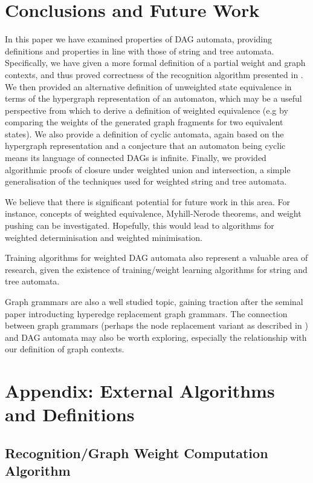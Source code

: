 \documentclass[11pt]{article}
\begin{document}
\section{Conclusions and Future Work}
In this paper we have examined properties of DAG automata, providing definitions
and properties in line with those of string and tree automata. Specifically, we
have given a more formal definition of a partial weight and graph contexts, and thus proved
correctness of the recognition algorithm presented in \cite{chiang2018weighted}.
We then provided an alternative definition of unweighted state equivalence in
terms of the hypergraph representation of an automaton, which may be a useful
perspective from which to derive a definition of weighted equivalence (e.g by
comparing the weights of the generated graph fragments for two equivalent
states). We also provide a definition of cyclic automata, again based on the
hypergraph representation and a conjecture that an automaton being cyclic means
its language of connected DAGs is infinite. Finally, we provided algorithmic proofs of
closure under weighted union and intersection, a simple generalisation of the
techniques used for weighted string and tree automata.  

We believe that there is significant potential for future work in this area. For
instance, concepts of weighted equivalence, Myhill-Nerode theorems, and weight
pushing can be investigated. Hopefully, this would lead to algorithms for weighted determinisation and
weighted minimisation. 

Training algorithms for weighted DAG automata also represent a valuable area of
research, given the existence of training/weight learning algorithms for string
and tree automata.

Graph grammars are also a well studied topic, gaining traction after the seminal
paper \cite{drewes1997hyperedge} introducting hyperedge replacement graph
grammars. The connection between graph grammars (perhaps the node replacement
variant as described in \cite{rozenberg1997handbook}) and DAG automata may also
be worth exploring, especially the relationship with our definition of graph contexts.





\appendix
\section{Appendix: External Algorithms and Definitions}
\subsection{Recognition/Graph Weight Computation Algorithm} 
\end{document}
